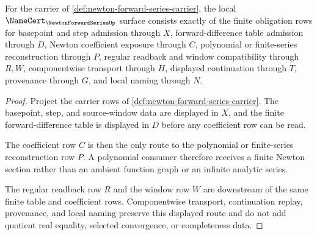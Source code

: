 \begin{theorem}
\label{thm:newton-forward-series-namecert-obligations}
For the carrier of \autoref{def:newton-forward-series-carrier}, the local $\NameCert_{\NewtonForwardSeriesUp}$ surface consists exactly of the finite obligation rows for basepoint and step admission through $X$, forward-difference table admission through $D$, Newton coefficient exposure through $C$, polynomial or finite-series reconstruction through $P$, regular readback and window compatibility through $R,W$, componentwise transport through $H$, displayed continuation through $T$, provenance through $G$, and local naming through $N$.
\end{theorem}
\begin{proof}
Project the carrier rows of \autoref{def:newton-forward-series-carrier}. The basepoint, step, and source-window data are displayed in $X$, and the finite forward-difference table is displayed in $D$ before any coefficient row can be read.

The coefficient row $C$ is then the only route to the polynomial or finite-series reconstruction row $P$. A polynomial consumer therefore receives a finite Newton section rather than an ambient function graph or an infinite analytic series.

The regular readback row $R$ and the window row $W$ are downstream of the same finite table and coefficient rows. Componentwise transport, continuation replay, provenance, and local naming preserve this displayed route and do not add quotient real equality, selected convergence, or completeness data.
\end{proof}

\begin{closurestatus}{\NewtonForwardSeriesUp}
  \theoryclosure{\seedClosure}
  \formalstatus{\unformalizedV}
\end{closurestatus}
